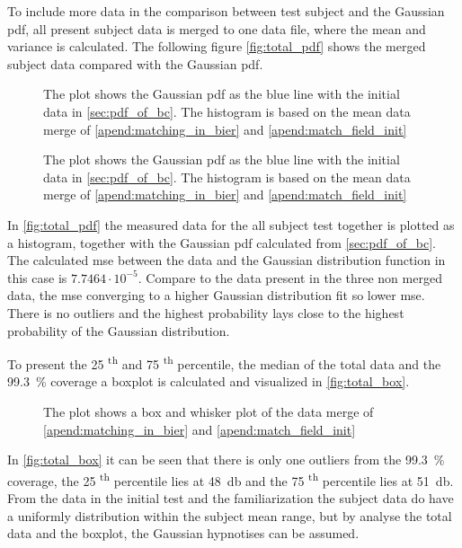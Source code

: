 To include more data in the comparison between test subject and the Gaussian \gls{pdf}, all present subject data is merged to one data file, where the mean and variance is calculated. The following figure \autoref{fig:total_pdf} shows the merged subject data compared with the Gaussian \gls{pdf}.


 \begin{figure}[H]
	\centering
	
		\caption{The plot shows the Gaussian  \gls{pdf} as the blue line with the initial data in \autoref{sec:pdf_of_bc}. The histogram is based on the mean data merge of \autoref{apend:matching_in_bier} and \autoref{apend:match_field_init}}
		\label{fig:total_pdf}
\end{figure}

 \begin{figure}[H]
	\centering
	
		\caption{The plot shows the Gaussian  \gls{pdf} as the blue line with the initial data in \autoref{sec:pdf_of_bc}. The histogram is based on the mean data merge of \autoref{apend:matching_in_bier} and \autoref{apend:match_field_init}}
		\label{fig:total_normplot}
\end{figure}

In \autoref{fig:total_pdf}  the measured data for the all subject test together is plotted as a histogram, together with the Gaussian \gls{pdf} calculated from \autoref{sec:pdf_of_bc}. The calculated \gls{mse} between the data and the Gaussian distribution function in this case is $7.7464 \cdot 10^{-5}$. Compare to the data present in the three non merged data, the \gls{mse} converging to a higher Gaussian distribution fit so lower \gls{mse}. There is no outliers and the highest probability lays close to the highest probability of the Gaussian distribution. 

To present the 25 \textsuperscript{th} and 75 \textsuperscript{th} percentile, the median of the total data and the \SI{99.3}{\percent} coverage a boxplot is calculated and visualized in \autoref{fig:total_box}.

 \begin{figure}[H]
	\centering
	
		\caption{The plot shows a box and whisker plot of the data merge of \autoref{apend:matching_in_bier} and \autoref{apend:match_field_init}}
		\label{fig:total_box}
\end{figure}


In \autoref{fig:total_box} it can be seen that there is only one outliers from the \SI{99.3}{\percent} coverage, the 25 \textsuperscript{th} percentile lies at \SI{48}{\decibel} and the 75 \textsuperscript{th} percentile lies at \SI{51}{\decibel}. From the data in the initial test and the familiarization the subject data do have a uniformly distribution within the subject mean range, but by analyse the total data and the boxplot, the Gaussian hypnotises can be assumed.


